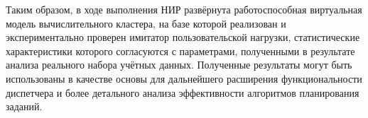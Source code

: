 Таким образом, в ходе выполнения НИР развёрнута работоспособная
виртуальная модель вычислительного кластера, на базе которой
реализован и экспериментально проверен имитатор пользовательской
нагрузки, статистические характеристики которого согласуются с
параметрами, полученными в результате анализа реального набора учётных
данных. Полученные результаты могут быть использованы в качестве
основы для дальнейшего расширения функциональности диспетчера и более
детального анализа эффективности алгоритмов планирования заданий.